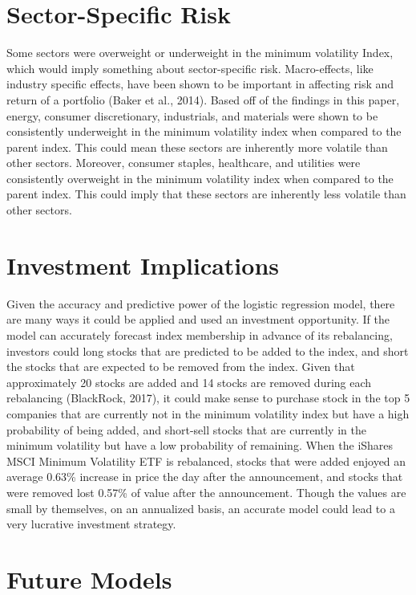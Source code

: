 \documentclass[12pt,twoside]{reedthesis}
\theoremstyle{definition}
\theoremstyle{definition}
\theoremstyle{definition}
\theoremstyle{remark}
\begin{document}
\section{Sector-Specific Risk}\label{sector-specific-risk}

Some sectors were overweight or underweight in the minimum volatility
Index, which would imply something about sector-specific risk.
Macro-effects, like industry specific effects, have been shown to be
important in affecting risk and return of a portfolio (Baker et al.,
2014). Based off of the findings in this paper, energy, consumer
discretionary, industrials, and materials were shown to be consistently
underweight in the minimum volatility index when compared to the parent
index. This could mean these sectors are inherently more volatile than
other sectors. Moreover, consumer staples, healthcare, and utilities
were consistently overweight in the minimum volatility index when
compared to the parent index. This could imply that these sectors are
inherently less volatile than other sectors.

\section{Investment Implications}\label{investment-implications}

Given the accuracy and predictive power of the logistic regression
model, there are many ways it could be applied and used an investment
opportunity. If the model can accurately forecast index membership in
advance of its rebalancing, investors could long stocks that are
predicted to be added to the index, and short the stocks that are
expected to be removed from the index. Given that approximately 20
stocks are added and 14 stocks are removed during each rebalancing
(BlackRock, 2017), it could make sense to purchase stock in the top 5
companies that are currently not in the minimum volatility index but
have a high probability of being added, and short-sell stocks that are
currently in the minimum volatility but have a low probability of
remaining. When the iShares MSCI Minimum Volatility ETF is rebalanced,
stocks that were added enjoyed an average 0.63\% increase in price the
day after the announcement, and stocks that were removed lost 0.57\% of
value after the announcement. Though the values are small by themselves,
on an annualized basis, an accurate model could lead to a very lucrative
investment strategy.

\section{Future Models}\label{future-models}
\end{document}

